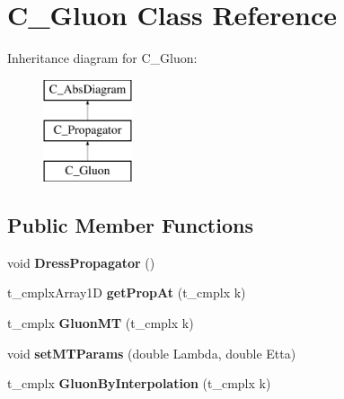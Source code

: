 \hypertarget{class_c___gluon}{\section{C\-\_\-\-Gluon Class Reference}
\label{class_c___gluon}
}
Inheritance diagram for C\-\_\-\-Gluon\-:\begin{figure}[H]
\begin{center}
\leavevmode
\includegraphics[height=3.000000cm]{class_c___gluon}
\end{center}
\end{figure}
\subsection*{Public Member Functions}
\begin{DoxyCompactItemize}
\item 
\hypertarget{class_c___gluon_a8f2d8414610472e70dde25b6365de533}{void {\bfseries Dress\-Propagator} ()}\label{class_c___gluon_a8f2d8414610472e70dde25b6365de533}

\item 
\hypertarget{class_c___gluon_a963ed16ab5c3ecff611219e8cb3435be}{t\-\_\-cmplx\-Array1\-D {\bfseries get\-Prop\-At} (t\-\_\-cmplx k)}\label{class_c___gluon_a963ed16ab5c3ecff611219e8cb3435be}

\item 
\hypertarget{class_c___gluon_adbb88aaa18446b1d12f087f4cb759293}{t\-\_\-cmplx {\bfseries Gluon\-M\-T} (t\-\_\-cmplx k)}\label{class_c___gluon_adbb88aaa18446b1d12f087f4cb759293}

\item 
\hypertarget{class_c___gluon_a2a2f857431b7a3cb1142631d31507091}{void {\bfseries set\-M\-T\-Params} (double Lambda, double Etta)}\label{class_c___gluon_a2a2f857431b7a3cb1142631d31507091}

\item 
\hypertarget{class_c___gluon_a49abed49290d265cc25f1213cdb3f7a3}{t\-\_\-cmplx {\bfseries Gluon\-By\-Interpolation} (t\-\_\-cmplx k)}\label{class_c___gluon_a49abed49290d265cc25f1213cdb3f7a3}

\end{DoxyCompactItemize}
